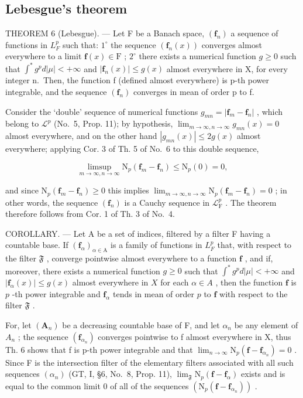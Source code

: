 \subsection{Lebesgue's theorem}

THEOREM 6 (Lebesgue). --- Let F be a Banach space, \((\mathbf{f}_{n})\) a sequence of functions in \(L_{F}^{p}\) such that: \(1^{\circ}\) the sequence \((\mathbf{f}_{n}(x))\) converges almost everywhere to a limit \(\mathbf{f}(x) \in \mathrm{F}\) ; \(2^{\circ}\) there exists a numerical function \(g \geqslant 0\) such that \(\int^{*} g^{p} d|\mu| < +\infty\) and \(|\mathbf{f}_{n}(x)| \leqslant g(x)\) almost everywhere in X, for every integer n.~Then, the function f (defined almost everywhere) is p-th power integrable, and the sequence \((\mathbf{f}_{n})\) converges in mean of order p to f.

Consider the `double' sequence of numerical functions \(g_{mn} = |\mathbf{f}_m - \mathbf{f}_n|\) , which belong to \(\mathcal{L}^p\) (No.~5, Prop. 11); by hypothesis, \(\lim_{m\to \infty, n\to \infty}g_{mn}(x) = 0\) almost everywhere, and on the other hand \(|g_{mn}(x)|\leqslant 2g(x)\) almost everywhere; applying Cor. 3 of Th. 5 of No.~6 to this double sequence,

\[
\limsup _ {m \to \infty ,   n \to \infty} \mathrm{N} _ {p} (\mathbf {f} _ {m} - \mathbf {f} _ {n}) \leqslant \mathrm{N} _ {p} (0) = 0  ,
\]

and since \(\mathrm{N}_p(\mathbf{f}_m - \mathbf{f}_n) \geqslant 0\) this implies \(\lim_{m \to \infty, n \to \infty} \mathrm{N}_p(\mathbf{f}_m - \mathbf{f}_n) = 0\) ; in other words, the sequence \((\mathbf{f}_n)\) is a Cauchy sequence in \(\mathcal{L}_{\mathrm{F}}^p\) . The theorem therefore follows from Cor. 1 of Th. 3 of No.~4.

COROLLARY. --- Let A be a set of indices, filtered by a filter F having a countable base. If \((\mathbf{f}_{\alpha})_{\alpha \in \mathrm{A}}\) is a family of functions in \(L_{F}^{p}\) that, with respect to the filter \(\mathfrak{F}\) , converge pointwise almost everywhere to a function \(\mathbf{f}\) , and if, moreover, there exists a numerical function \(g \geqslant 0\) such that \(\int^{*} g^{p} d|\mu| < +\infty\) and \(|\mathbf{f}_{\alpha}(x)| \leqslant g(x)\) almost everywhere in \(X\) for each \(\alpha \in A\) , then the function \(\mathbf{f}\) is \(p\) -th power integrable and \(\mathbf{f}_{\alpha}\) tends in mean of order \(p\) to \(\mathbf{f}\) with respect to the filter \(\mathfrak{F}\) .

For, let \((\mathbf{A}_{n})\) be a decreasing countable base of F, and let \(\alpha_{n}\) be any element of \(A_{n}\) ; the sequence \((\mathbf{f}_{\alpha_{n}})\) converges pointwise to f almost everywhere in X, thus Th. 6 shows that f is p-th power integrable and that \(\lim_{n\to\infty}\mathrm{N}_{p}(\mathbf{f}-\mathbf{f}_{\alpha_{n}})=0\) . Since F is the intersection filter of the elementary filters associated with all such sequences \((\alpha_{n})\) (GT, I, §6, No.~8, Prop. 11), \(\lim_{\mathfrak{F}}\mathrm{N}_{p}(\mathbf{f}-\mathbf{f}_{\alpha})\) exists and is equal to the common limit 0 of all of the sequences \((\mathrm{N}_{p}(\mathbf{f}-\mathbf{f}_{\alpha_{n}}))\) .

